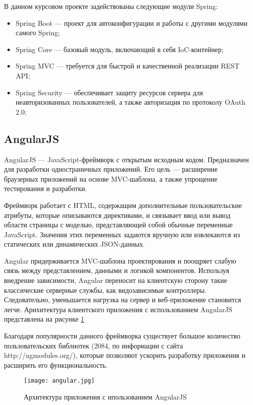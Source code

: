 В данном курсовом проекте задействованы следующие модули Spring:
\begin{itemize}
  \item Spring Boot --- проект для автоконфигурации и работы с другими модулями самого Spring;
  \item Spring Core --- базовый модуль, включающий в себя IoC-контейнер;
  \item Spring MVC --- требуется для быстрой и качественной реализации REST API;
  \item Spring Security --- обеспечивает защиту ресурсов сервера для неавторизованных пользователей, а также
  авторизация по протоколу OAuth 2.0;
\end{itemize}

\subsection{AngularJS}
\label{sec:angular}

AngularJS --- JavaScript-фреймворк с открытым исходным кодом. Предназначен для разработки одностраничных приложений. 
Его цель --- расширение браузерных приложений на основе MVC-шаблона, а также упрощение тестирования и разработки.

Фреймворк работает с HTML, содержащим дополнительные пользовательские атрибуты, которые описываются директивами, 
и связывает ввод или вывод области страницы с моделью, представляющей собой обычные переменные JavaScript. 
Значения этих переменных задаются вручную или извлекаются из статических или динамических JSON-данных.

Angular придерживается MVC-шаблона проектирования и поощряет слабую связь между представлением, данными и логикой 
компонентов. Используя внедрение зависимости, Angular переносит на клиентскую сторону такие классические серверные 
службы, как видозависимые контроллеры. Следовательно, уменьшается нагрузка на сервер и веб-приложение становится легче. 
Арихитектура клиентского приложения с использованием AngularJS представлена на рисунке \ref{fig:angular}

Благодаря популярности данного фреймворка существует большое количество пользовательских библиотек (2084, по информации с 
сайта \\ http://ngmodules.org/), которые позволяют ускорить разработку приложения и расширить его функциональность.

\begin{figure}[h] 
  \centering  
  \texttt{[image: angular.jpg]}
  \caption{Архитектура приложения с ипользованием AngularJS}
  \label{fig:angular}
\end{figure}
